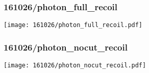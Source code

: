 \begin{frame}
   \frametitle{\small 161026/photon\_full\_recoil}
   \centering
   \texttt{[image: 161026/photon\_full\_recoil.pdf]}
\end{frame}

\begin{frame}
   \frametitle{\small 161026/photon\_nocut\_recoil}
   \centering
   \texttt{[image: 161026/photon\_nocut\_recoil.pdf]}
\end{frame}

